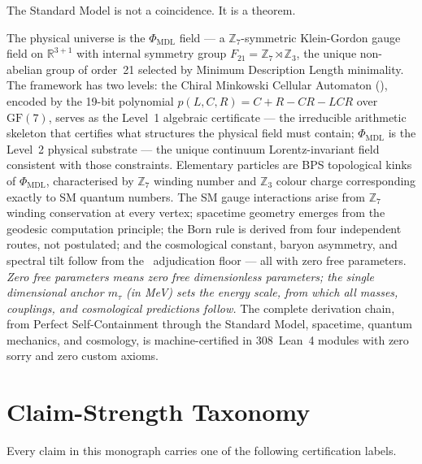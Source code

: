 \documentclass[11pt,openany]{book}
\theoremstyle{remark}
\newcommand{\PSC}{\text{PSC}}
\newcommand{\PHIMDL}{\Phi_{\mathrm{MDL}}}
\newcommand{\CMCA}{\text{CMCA}}
\newcommand{\poly}{p(L,C,R)}
\begin{document}
The Standard Model is not a coincidence. It is a theorem.

\begin{tcolorbox}[colback=green!5,colframe=green!50!black,
  title={The Central Claim of This Monograph}]
The physical universe is the $\PHIMDL$ field --- a $\mathbb{Z}_7$-symmetric
Klein-Gordon gauge field on $\mathbb{R}^{3+1}$ with internal symmetry group
$F_{21} = \mathbb{Z}_7 \rtimes \mathbb{Z}_3$, the unique non-abelian group of
order~21 selected by Minimum Description Length minimality.
The framework has two levels: the Chiral Minkowski Cellular Automaton (\CMCA),
encoded by the 19-bit polynomial $\poly = C{+}R{-}CR{-}LCR$ over $\mathrm{GF}(7)$,
serves as the Level~1 algebraic certificate --- the irreducible arithmetic
skeleton that certifies what structures the physical field must contain;
$\PHIMDL$ is the Level~2 physical substrate --- the unique continuum
Lorentz-invariant field consistent with those constraints.
Elementary particles are BPS topological kinks of $\PHIMDL$, characterised
by $\mathbb{Z}_7$ winding number and $\mathbb{Z}_3$ colour charge
corresponding exactly to SM quantum numbers.
The SM gauge interactions arise from $\mathbb{Z}_7$ winding conservation at
every vertex; spacetime geometry emerges from the geodesic computation
principle; the Born rule is derived from four independent routes, not
postulated; and the cosmological constant, baryon asymmetry, and spectral
tilt follow from the \PSC\ adjudication floor --- all with zero free
parameters.
\emph{Zero free parameters means zero free dimensionless parameters; the single
dimensional anchor $m_\tau$ (in MeV) sets the energy scale, from which all masses,
couplings, and cosmological predictions follow.}
The complete derivation chain, from Perfect Self-Containment through the
Standard Model, spacetime, quantum mechanics, and cosmology, is
machine-certified in 308~Lean~4 modules with zero sorry and zero custom axioms.
\end{tcolorbox}

\chapter*{Claim-Strength Taxonomy}
\label{chap:taxonomy}

Every claim in this monograph carries one of the following certification labels.
\end{document}
